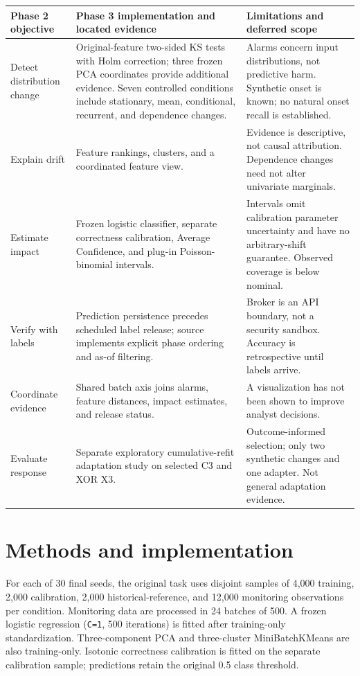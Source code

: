 \documentclass[10pt]{article}
\begin{document}
\begin{table}[h]
\small\centering
\begin{tabularx}{\linewidth}{p{.22\linewidth}XX}
\toprule
Phase 2 objective & Phase 3 implementation and located evidence & Limitations and deferred scope\\
\midrule
Detect distribution change & Original-feature two-sided KS tests with Holm correction; three frozen PCA coordinates provide additional evidence. Seven controlled conditions include stationary, mean, conditional, recurrent, and dependence changes. & Alarms concern input distributions, not predictive harm. Synthetic onset is known; no natural onset recall is established.\\
Explain drift & Feature rankings, clusters, and a coordinated feature view. & Evidence is descriptive, not causal attribution. Dependence changes need not alter univariate marginals.\\
Estimate impact & Frozen logistic classifier, separate correctness calibration, Average Confidence, and plug-in Poisson-binomial intervals. & Intervals omit calibration parameter uncertainty and have no arbitrary-shift guarantee. Observed coverage is below nominal.\\
Verify with labels & Prediction persistence precedes scheduled label release; source implements explicit phase ordering and as-of filtering. & Broker is an API boundary, not a security sandbox. Accuracy is retrospective until labels arrive.\\
Coordinate evidence & Shared batch axis joins alarms, feature distances, impact estimates, and release status. & A visualization has not been shown to improve analyst decisions.\\
Evaluate response & Separate exploratory cumulative-refit adaptation study on selected C3 and XOR X3. & Outcome-informed selection; only two synthetic changes and one adapter. Not general adaptation evidence.\\
\bottomrule
\end{tabularx}
\end{table}

\section{Methods and implementation}
For each of 30 final seeds, the original task uses disjoint samples of 4,000 training, 2,000 calibration, 2,000 historical-reference, and 12,000 monitoring observations per condition. Monitoring data are processed in 24 batches of 500. A frozen logistic regression (\texttt{C=1}, 500 iterations) is fitted after training-only standardization. Three-component PCA and three-cluster MiniBatchKMeans are also training-only. Isotonic correctness calibration is fitted on the separate calibration sample; predictions retain the original 0.5 class threshold.
\end{document}
